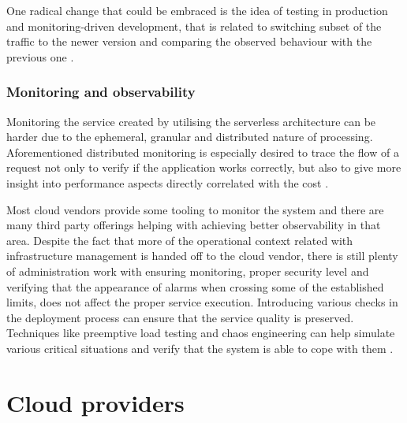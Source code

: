 One radical change that could be embraced is the idea of testing in production and monitoring-driven development, that is related to switching subset of the traffic to the newer version and comparing the observed behaviour with the previous one \cite{MartinFowlerServerless}.

\subsubsection*{Monitoring and observability}

Monitoring the service created by utilising the serverless architecture can be harder due to the ephemeral, granular and distributed nature of processing. Aforementioned distributed monitoring is especially desired to trace the flow of a request not only to verify if the application works correctly, but also to give more insight into performance aspects directly correlated with the cost \cite{LeveragingServerlessCloudComputingArchitectures}.

Most cloud vendors provide some tooling to monitor the system and there are many third party offerings helping with achieving better observability in that area. Despite the fact that more of the operational context related with infrastructure management is handed off to the cloud vendor, there is still plenty of administration work with ensuring monitoring, proper security level and verifying that the appearance of alarms when crossing some of the established limits, does not affect the proper service execution. Introducing various checks in the deployment process can ensure that the service quality is preserved. Techniques like preemptive load testing and chaos engineering can help simulate various critical situations and verify that the system is able to cope with them \cite{MartinFowlerServerless}.

\section{Cloud providers}

